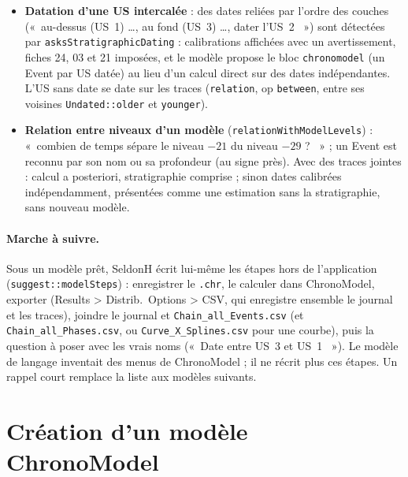 \documentclass[11pt,a4paper]{article}
\providecommand{\og}{«~}\providecommand{\fg}{\unskip~»}
\newcommand{\code}[1]{\texttt{\small #1}}
\begin{document}
\begin{itemize}[leftmargin=*]
  la période d'étude.
\item \textbf{Datation d'une US intercalée} : des dates reliées par l'ordre des couches (\og au-dessus (US~1) \dots, au
  fond (US~3) \dots, dater l'US~2 \fg) sont détectées par \code{asksStratigraphicDating} : calibrations affichées avec un
  avertissement, fiches 24, 03 et 21 imposées, et le modèle propose le bloc \code{chronomodel} (un Event par US datée)
  au lieu d'un calcul direct sur des dates indépendantes. L'US sans date se date sur les traces (\code{relation}, op
  \code{between}, entre ses voisines \code{Undated::older} et \code{younger}).
\item \textbf{Relation entre niveaux d'un modèle} (\code{relationWithModelLevels}) : \og combien de temps sépare le
  niveau $-21$ du niveau $-29$ ? \fg{} ; un Event est reconnu par son nom ou sa profondeur (au signe près). Avec des
  traces jointes : calcul a posteriori, stratigraphie comprise ; sinon dates calibrées indépendamment, présentées comme
  une estimation sans la stratigraphie, sans nouveau modèle.
\end{itemize}

\paragraph{Marche à suivre.} Sous un modèle prêt, SeldonH écrit lui-même les étapes hors de l'application
(\code{suggest::modelSteps}) : enregistrer le \code{.chr}, le calculer dans ChronoModel, exporter (Results >
Distrib.\ Options > CSV, qui enregistre ensemble le journal et les traces), joindre le journal et
\code{Chain\_all\_Events.csv} (et \code{Chain\_all\_Phases.csv}, ou \code{Curve\_X\_Splines.csv} pour une courbe), puis la
question à poser avec les vrais noms (\og Date entre US~3 et US~1 \fg). Le modèle de langage inventait des menus de
ChronoModel ; il ne récrit plus ces étapes. Un rappel court remplace la liste aux modèles suivants.

\section{Création d'un modèle ChronoModel}
\end{document}
